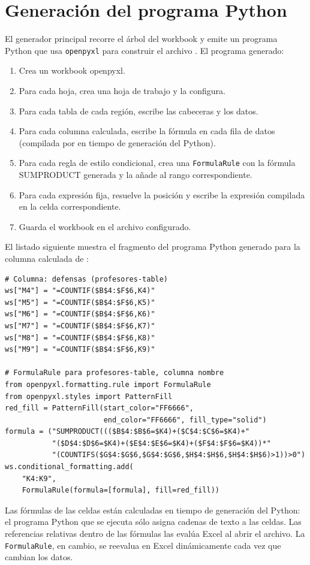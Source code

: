 \section{Generaci\'on del programa Python}
\label{sec:generacion-python}

El generador principal recorre el \'arbol del workbook y emite un programa
Python que usa \texttt{openpyxl} para construir el archivo \xlsx{}.  El
programa generado:

\begin{enumerate}
  \item Crea un workbook openpyxl.
  \item Para cada hoja, crea una hoja de trabajo y la configura.
  \item Para cada tabla de cada regi\'on, escribe las cabeceras y los datos.
  \item Para cada columna calculada, escribe la f\'ormula en cada fila de
    datos (compilada por  en tiempo de generaci\'on
    del Python).
  \item Para cada regla de estilo condicional, crea una
    \texttt{FormulaRule} con la f\'ormula SUMPRODUCT generada y la a\~nade
    al rango correspondiente.
  \item Para cada expresi\'on fija, resuelve la posici\'on  y escribe
    la expresi\'on compilada en la celda correspondiente.
  \item Guarda el workbook en el archivo \xlsx{} configurado.
\end{enumerate}

El listado siguiente muestra el fragmento del programa Python generado para
la columna calculada  de :

\begin{lstlisting}[style=pythonstyle,
  caption={Fragmento del programa Python generado para la columna computed.}]
# Columna: defensas (profesores-table)
ws["M4"] = "=COUNTIF($B$4:$F$6,K4)"
ws["M5"] = "=COUNTIF($B$4:$F$6,K5)"
ws["M6"] = "=COUNTIF($B$4:$F$6,K6)"
ws["M7"] = "=COUNTIF($B$4:$F$6,K7)"
ws["M8"] = "=COUNTIF($B$4:$F$6,K8)"
ws["M9"] = "=COUNTIF($B$4:$F$6,K9)"

# FormulaRule para profesores-table, columna nombre
from openpyxl.formatting.rule import FormulaRule
from openpyxl.styles import PatternFill
red_fill = PatternFill(start_color="FF6666",
                       end_color="FF6666", fill_type="solid")
formula = ("SUMPRODUCT((($B$4:$B$6=$K4)+($C$4:$C$6=$K4)+"
           "($D$4:$D$6=$K4)+($E$4:$E$6=$K4)+($F$4:$F$6=$K4))*"
           "(COUNTIFS($G$4:$G$6,$G$4:$G$6,$H$4:$H$6,$H$4:$H$6)>1))>0")
ws.conditional_formatting.add(
    "K4:K9",
    FormulaRule(formula=[formula], fill=red_fill))
\end{lstlisting}

Las f\'ormulas de las celdas est\'an calculadas en tiempo de generaci\'on del
Python: el programa Python que se ejecuta s\'olo asigna cadenas de texto a las
celdas.  Las referencias relativas dentro de las f\'ormulas las eval\'ua Excel
al abrir el archivo.  La \texttt{FormulaRule}, en cambio, se reevalua
en Excel din\'amicamente cada vez que cambian los datos.

